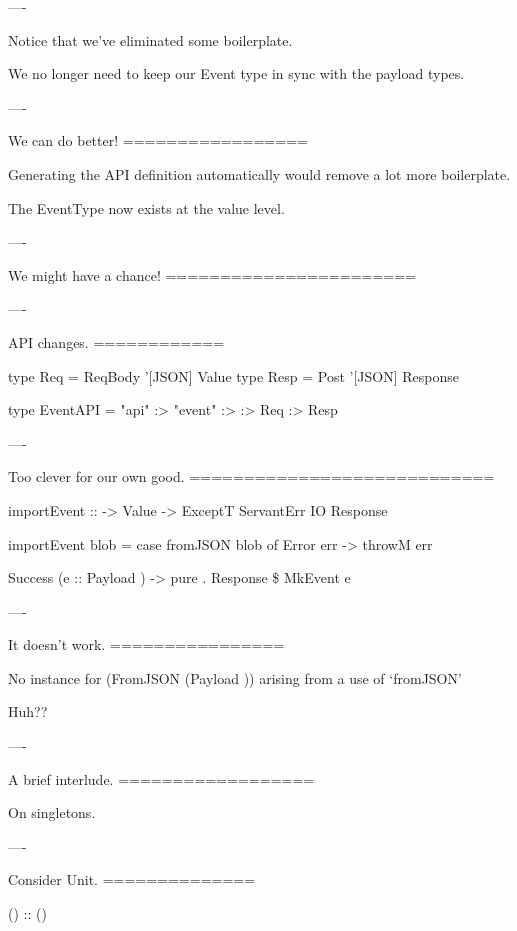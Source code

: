 ----

Notice that we've eliminated some boilerplate.

We no longer need to keep our Event type in sync with the payload types.

----

We can do better!
=================

Generating the API definition automatically would remove a lot more boilerplate.

The EventType now exists at the value level.

----

We might have a chance!
=======================

----

API changes.
============

\begin{raw}
  type Req  = ReqBody '[JSON] Value
  type Resp = Post    '[JSON] Response

  type EventAPI =
    "api" :>
      "event" :>
         :> Req :> Resp
\end{raw}

----

Too clever for our own good.
============================

\begin{raw}
  importEvent :: 
              -> Value
              -> ExceptT ServantErr IO Response

  importEvent  blob =
    case fromJSON blob of
      Error err ->
        throwM err

      Success (e :: Payload ) ->
        pure . Response \$ MkEvent e
\end{raw}

----

It doesn't work.
================

\begin{error}
  No instance for (FromJSON (Payload ))
    arising from a use of `fromJSON'
\end{error}

Huh??

----

A brief interlude.
==================

On singletons.

----

Consider Unit.
==============

\begin{hs}
  () :: ()
\end{hs}

